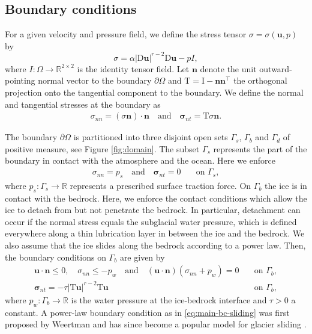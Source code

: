 \documentclass[onefignum,onetabnum]{siamart190516}
\newcommand{\RR}{\mathbb{R}}
\newcommand{\bn}{\boldsymbol{n}}
\newcommand{\bu}{\boldsymbol{u}}
\newcommand{\bsigma}{\boldsymbol{\sigma}}
\newcommand{\bT}{\boldsymbol{\mathrm{T}}}
\newcommand{\bI}{\boldsymbol{\mathrm{I}}}
\newcommand{\bD}{\boldsymbol{\mathrm{D}}}
\begin{document}
\subsection{Boundary conditions}

For a given velocity and pressure field, we define the stress tensor $\sigma = \sigma(\bu,p)$ by 
%
\[
	\sigma = \alpha |\bD\bu|^{r-2}\bD\bu - pI,
\]
%
where $I:\Omega\to\RR^{2\times 2}$ is the identity tensor field. Let $\bn$ denote the unit outward-pointing normal vector to the boundary $\partial\Omega$ and $\bT = \bI - \bn \bn^\top$ the orthogonal projection onto the tangential component to the boundary. We define the normal and tangential stresses at the boundary as
%
\begin{align*}
	\sigma_{nn} = (\sigma\bn)\cdot \bn \quad \text{and} \quad \bsigma_{nt} = \bT\sigma\bn.
\end{align*}

The boundary $\partial\Omega$ is partitioned into three disjoint open sets $\Gamma_s$, $\Gamma_b$ and $\Gamma_d$ of positive measure, see Figure \ref{fig:domain}. The subset $\Gamma_s$ represents the part of the boundary in contact with the atmosphere and the ocean. Here we enforce
%
\begin{align}\label{eq:bc-gammas}
	\sigma_{nn} = p_s \quad \text{and} \quad \bsigma_{nt} = 0 \quad & \text{on $\Gamma_s$},
\end{align}
%
where $p_s:\Gamma_s\to\RR$ represents a prescribed surface traction force. On $\Gamma_b$ the ice is in contact with the bedrock. Here, we enforce the contact conditions which allow the ice to detach from but not penetrate the bedrock. In particular, detachment can occur if the normal stress equals the subglacial water pressure, which is defined everywhere along a thin lubrication layer in between the ice and the bedrock. We also assume that the ice slides along the bedrock according to a power law. Then, the boundary conditions on $\Gamma_b$ are given by 
%
\begin{subequations}\label{eq:bc-gammab}
	\begin{align}
		\bu\cdot\bn \leq 0,\quad \sigma_{nn} \leq -p_w \quad \text{and} \quad \left(\bu\cdot\bn\right)\left(\sigma_{nn} + p_w \right) = 0 & \quad \text{on $\Gamma_b$}, \label{eq:main-bc-contact} \\
		\bsigma_{nt} = - \tau | \bT\bu |^{r-2}\bT\bu & \quad \text{on $\Gamma_b$},\label{eq:main-bc-sliding}
	\end{align}
\end{subequations}
%
where $p_w : \Gamma_b \to \RR$ is the water pressure at the ice-bedrock interface and $\tau > 0$ a constant. A power-law boundary condition as in \eqref{eq:main-bc-sliding} was first proposed by Weertman \cite{weertman1957} and has since become a popular model for glacier sliding \cite{greve2009, fowler2011}.
\end{document}
